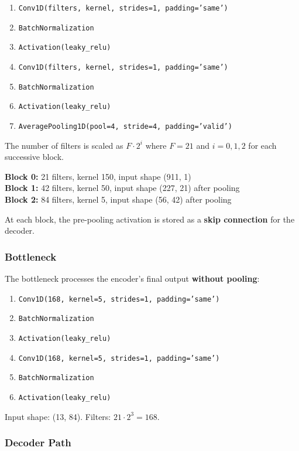 \documentclass[11pt,a4paper]{article}
\begin{document}
\begin{enumerate}
    \item \texttt{Conv1D(filters, kernel, strides=1, padding='same')}
    \item \texttt{BatchNormalization}
    \item \texttt{Activation(leaky\_relu)}
    \item \texttt{Conv1D(filters, kernel, strides=1, padding='same')}
    \item \texttt{BatchNormalization}
    \item \texttt{Activation(leaky\_relu)}
    \item \texttt{AveragePooling1D(pool=4, stride=4, padding='valid')}
\end{enumerate}

The number of filters is scaled as $F \cdot 2^i$ where $F = 21$ and $i = 0, 1, 2$ for each successive block.

\textbf{Block 0:} 21 filters, kernel 150, input shape (911, 1) \\
\textbf{Block 1:} 42 filters, kernel 50, input shape (227, 21) after pooling \\
\textbf{Block 2:} 84 filters, kernel 5, input shape (56, 42) after pooling

At each block, the pre-pooling activation is stored as a \textbf{skip connection} for the decoder.

\subsubsection*{Bottleneck}

The bottleneck processes the encoder's final output \textbf{without pooling}:

\begin{enumerate}
    \item \texttt{Conv1D(168, kernel=5, strides=1, padding='same')}
    \item \texttt{BatchNormalization}
    \item \texttt{Activation(leaky\_relu)}
    \item \texttt{Conv1D(168, kernel=5, strides=1, padding='same')}
    \item \texttt{BatchNormalization}
    \item \texttt{Activation(leaky\_relu)}
\end{enumerate}

Input shape: (13, 84). Filters: $21 \cdot 2^3 = 168$.

\subsubsection*{Decoder Path}
\end{document}
